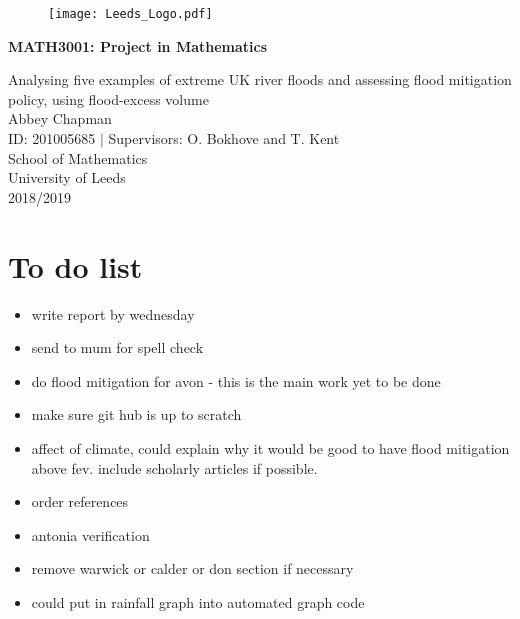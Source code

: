 \documentclass[11pt,a4paper]{article}
\begin{document}

\begin{titlepage}
\begin{center}

\begin{figure}[t]
\raggedleft
\texttt{[image: Leeds\_Logo.pdf]}
\end{figure}
 

\vspace*{5cm}
{\huge \textbf{MATH3001: Project in Mathematics}}\\
\hrulefill

\vspace*{0.1cm}
{\LARGE Analysing five examples of extreme UK river floods and assessing flood mitigation policy, using flood-excess volume}\\
\vspace{1cm}
{\large Abbey Chapman}\\
{\large ID: 201005685 $|$ Supervisors: O. Bokhove and T. Kent}\\
\vfill
School of Mathematics\\
University of Leeds\\
2018/2019
\end{center}
\end{titlepage}

\tableofcontents 
\noindent \hrulefill

\newpage
\section{To do list}
\begin{itemize}
\item write report by wednesday
\item send to mum for spell check
\item do flood mitigation for avon - this is the main work yet to be done
\item make sure git hub is up to scratch
\item affect of climate, could explain why it would be good to have flood mitigation above fev. include scholarly articles if possible.
\item order references
\item antonia verification
\item remove warwick or calder or don section if necessary
\item could put in rainfall graph into automated graph code 
\end{itemize}
\end{document}
